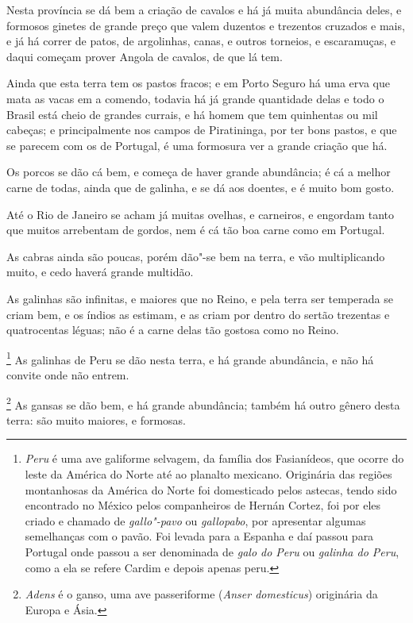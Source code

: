 Nesta província se dá bem a criação de cavalos e há
já muita abundância deles, e formosos ginetes de grande preço que valem
duzentos e trezentos cruzados e mais, e já há correr de patos, de
argolinhas, canas, e outros torneios, e escaramuças, e daqui começam
prover Angola de cavalos, de que lá tem.

 Ainda que esta terra tem os pastos fracos; e em Porto
Seguro há uma erva que mata as vacas em a comendo, todavia há já grande
quantidade delas e todo o Brasil está cheio de grandes currais, e há
homem que tem quinhentas ou mil cabeças; e principalmente nos campos de
Piratininga, por ter bons pastos, e que se parecem com os de Portugal,
é uma formosura ver a grande criação que há.

 Os porcos se dão cá bem, e começa de haver grande
abundância; é cá a melhor carne de todas, ainda que de galinha, e se dá
aos doentes, e é muito bom gosto.

 Até o Rio de Janeiro se acham já muitas ovelhas, e
carneiros, e engordam tanto que muitos arrebentam de gordos, nem é cá
tão boa carne como em Portugal.

 As cabras ainda são poucas, porém dão"-se bem na
terra, e vão multiplicando muito, e cedo haverá grande multidão.

 As galinhas são infinitas, e maiores que no Reino,
e pela terra ser temperada se criam bem, e os índios as estimam, e as
criam por dentro do sertão trezentas e quatrocentas léguas; não é a
carne delas tão gostosa como no Reino.

\footnote{ \textit{Peru} é uma ave galiforme selvagem,
da família dos Fasianídeos, que ocorre do leste da América do Norte até
ao planalto mexicano. Originária das regiões montanhosas da América do
Norte foi domesticado pelos astecas, tendo sido encontrado no México
pelos companheiros de Hernán Cortez, foi por eles criado e chamado de
\textit{gallo"-pavo} ou \textit{gallopabo}, por apresentar algumas
semelhanças com o pavão. Foi levada para a Espanha e daí passou para
Portugal onde passou a ser denominada de \textit{galo do Peru} ou
\textit{galinha do Peru}, como a ela se refere Cardim e depois apenas
peru.} As galinhas de Peru se dão nesta terra, e há grande
abundância, e não há convite onde não entrem.

\footnote{ \textit{Adens} é o ganso, uma ave
passeriforme (\textit{Anser domesticus}) originária da Europa e
Ásia.} As gansas se dão bem, e há grande abundância; também
há outro gênero desta terra: são muito maiores, e formosas.

